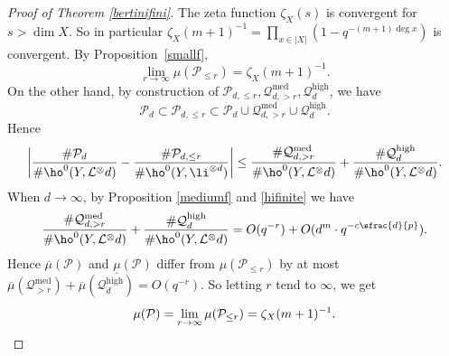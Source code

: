 \begin{proof}[Proof of Theorem \ref{bertinifini}]
The zeta function $\zeta_X(s)$ is convergent for $s>\dim X$. So in particular $\zeta_X(m+1)^{-1}=\prod_{x\in |X|}(1-q^{-(m+1)\deg x})$ is convergent. By Proposition~\ref{smallf},
\[
\lim_{r\to \infty}\mu(\mathcal{P}_{\leq r})=\zeta_X(m+1)^{-1}.
\]
On the other hand, by construction of $\mathcal{P}_{d,\leq r},\mathcal{Q}_{d, >r}^{\mathrm{med}},\mathcal{Q}_{d}^{\mathrm{high}}$, we have
\[
\mathcal{P}_{d} \subset \mathcal{P}_{d,\leq r} \subset \mathcal{P}_{d}\cup \mathcal{Q}_{d, >r}^{\mathrm{med}}\cup \mathcal{Q}_{d}^{\mathrm{high}}.
\]
Hence
\[
\left| \frac{ \#\mathcal{P}_{d}}{\# \ho^0(Y, \mathcal{L}^\otimes{d})} -\frac{\#\mathcal{P}_{d,\leq r}}{\#\ho^0(Y, \li^{\otimes d})} \right|\leq \frac{ \#\mathcal{Q}_{d, >r}^{\mathrm{med}}}{\# \ho^0(Y, \mathcal{L}^\otimes{d})}+\frac{ \#\mathcal{Q}_{d}^{\mathrm{high}}}{\# \ho^0(Y, \mathcal{L}^\otimes{d})}.
\]
When $d\to \infty$, by Proposition \ref{mediumf} and \ref{hifinite} we have
\[
\frac{ \#\mathcal{Q}_{d, >r}^{\mathrm{med}}}{\# \ho^0(Y, \mathcal{L}^\otimes{d})}+\frac{ \#\mathcal{Q}_{d}^{\mathrm{high}}}{\# \ho^0(Y, \mathcal{L}^\otimes{d})}
=O(q^{-r})+O(d^{m}\cdot q^{-c\sfrac{d}{p}}).
\]
Hence $\overline{\mu}(\mathcal{P})$ and $\underline{\mu}(\mathcal{P})$ differ from $\mu(\mathcal{P}_{\leq r})$ by at most $\overline{\mu}(\mathcal{Q}_{>r}^{\mathrm{med}})+\overline{\mu}(\mathcal{Q}_{d}^{\mathrm{high}})=O(q^{-r})$. So letting $r$ tend to $\infty$, we get
\[
\mu(\mathcal{P})=\lim_{r\to \infty}\mu(\mathcal{P}_{\leq r})=\zeta_X(m+1)^{-1}.\qedhere
\]
\end{proof}
